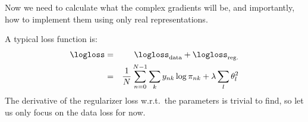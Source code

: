   Now we need to calculate what the complex gradients will be, and importantly,
  how to implement them using only real representations.

  A typical loss function is:
  \begin{eqnarray*}
    \logloss &=& \dataloss + \logloss_{\text{reg.}} \\
      &=& \frac{1}{N}\sum_{n=0}^{N-1} \sum_{k} y_{nk}\log \pi_{nk} + \lambda
      \sum_l \theta_l^2
  \end{eqnarray*}
  The derivative of the regularizer loss w.r.t.\ the parameters is trivial to
  find, so let us only focus on the data loss for now.
